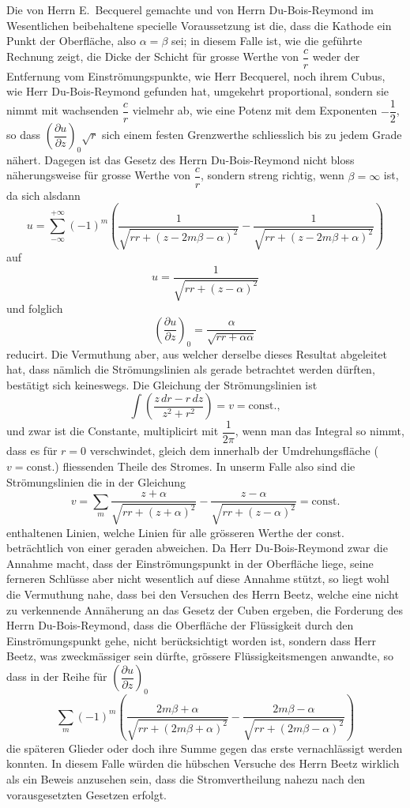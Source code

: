 \documentclass[12pt,a4paper]{article}
\begin{document}
Die von Herrn E.~Becquerel gemachte und von Herrn Du-Bois-Reymond im Wesentlichen beibehaltene specielle Voraussetzung ist die, dass die Kathode ein Punkt der Oberfläche, also $\alpha = \beta$ sei; in diesem Falle ist, wie die geführte Rechnung zeigt, die Dicke der Schicht für grosse Werthe von $\dfrac{c}{r}$ weder der Entfernung vom Einströmungspunkte, wie Herr Becquerel, noch ihrem Cubus, wie Herr Du-Bois-Reymond gefunden hat, umgekehrt proportional, sondern sie nimmt mit wachsenden $\dfrac{c}{r}$ vielmehr ab, wie eine Potenz mit dem Exponenten $-\dfrac{1}{2}$, so dass $\left(\dfrac{\partial u}{\partial z}\right)_0 \sqrt{r}$ sich einem festen Grenzwerthe schliesslich bis zu jedem Grade nähert. Dagegen ist das Gesetz des Herrn Du-Bois-Reymond nicht bloss näherungsweise für grosse Werthe von $\dfrac{c}{r}$, sondern streng richtig, wenn $\beta = \infty$ ist, da sich alsdann
\[
u = \sum_{-\infty}^{+\infty} (-1)^m \left( \frac{1}{\sqrt{rr + (z - 2m\beta - \alpha)^2}} - \frac{1}{\sqrt{rr + (z - 2m\beta + \alpha)^2}} \right)
\]
auf
\[
u = \frac{1}{\sqrt{rr + (z - \alpha)^2}}
\]
und folglich
\[
\left(\frac{\partial u}{\partial z}\right)_0 = \frac{\alpha}{\sqrt{rr + \alpha\alpha}}
\]
reducirt. Die Vermuthung aber, aus welcher derselbe dieses Resultat abgeleitet hat, dass nämlich die Strömungslinien als gerade betrachtet werden dürften, bestätigt sich keineswegs. Die Gleichung der Strömungslinien ist
\[
\int \left(\frac{z\,dr - r\,dz}{z^2 + r^2}\right) = v = \text{const.},
\]
und zwar ist die Constante, multiplicirt mit $\dfrac{1}{2\pi}$, wenn man das Integral so nimmt, dass es für $r = 0$ verschwindet, gleich dem innerhalb der Umdrehungsfläche ($v = \text{const.}$) fliessenden Theile des Stromes. In unserm Falle also sind die Strömungslinien die in der Gleichung
\[
v = \sum_m \frac{z + \alpha}{\sqrt{rr + (z + \alpha)^2}} - \frac{z - \alpha}{\sqrt{rr + (z - \alpha)^2}} = \text{const.}
\]
enthaltenen Linien, welche Linien für alle grösseren Werthe der const. beträchtlich von einer geraden abweichen. Da Herr Du-Bois-Reymond zwar die Annahme macht, dass der Einströmungspunkt in der Oberfläche liege, seine ferneren Schlüsse aber nicht wesentlich auf diese Annahme stützt, so liegt wohl die Vermuthung nahe, dass bei den Versuchen des Herrn Beetz, welche eine nicht zu verkennende Annäherung an das Gesetz der Cuben ergeben, die Forderung des Herrn Du-Bois-Reymond, dass die Oberfläche der Flüssigkeit durch den Einströmungspunkt gehe, nicht berücksichtigt worden ist, sondern dass Herr Beetz, was zweckmässiger sein dürfte, grössere Flüssigkeitsmengen anwandte, so dass in der Reihe für $\left(\dfrac{\partial u}{\partial z}\right)_0$
\[
\sum_m (-1)^m \left( \frac{2m\beta + \alpha}{\sqrt{rr + (2m\beta + \alpha)^2}} - \frac{2m\beta - \alpha}{\sqrt{rr + (2m\beta - \alpha)^2}} \right)
\]
die späteren Glieder oder doch ihre Summe gegen das erste vernachlässigt werden konnten. In diesem Falle würden die hübschen Versuche des Herrn Beetz wirklich als ein Beweis anzusehen sein, dass die Stromvertheilung nahezu nach den vorausgesetzten Gesetzen erfolgt.
\end{document}
